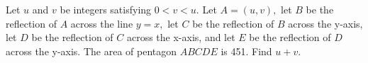 Let $u$ and $v$ be integers satisfying $0<v<u.$ Let $A=(u,v),$ let $B$ be the reflection of $A$ across the line $y=x,$ let $C$ be the reflection of $B$ across the y-axis, let $D$ be the reflection of $C$ across the x-axis, and let $E$ be the reflection of $D$ across the y-axis. The area of pentagon $ABCDE$ is 451. Find $u+v.$